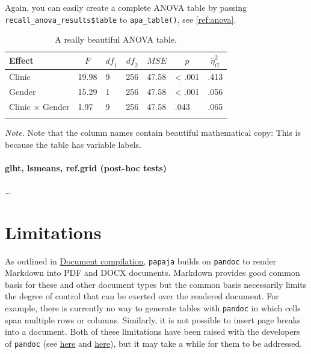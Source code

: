 \documentclass[man,floatsintext]{apa6}
\let\oldparagraph\paragraph
\renewcommand{\paragraph}[1]{\oldparagraph{#1}\mbox{}}
\theoremstyle{definition}
\theoremstyle{definition}
\theoremstyle{definition}
\theoremstyle{remark}
\begin{document}
Again, you can easily create a complete ANOVA table by passing
\texttt{recall\_anova\_results\$table} to \texttt{apa\_table()}, see
\autoref{ref:anova}.

\begin{table}[tbp]
\begin{center}
\begin{threeparttable}
\caption{\label{tab:anova-table}A really beautiful ANOVA table.}
\begin{tabular}{lllllll}
\toprule
Effect & \multicolumn{1}{c}{$F$} & \multicolumn{1}{c}{$\mathit{df}_1$} & \multicolumn{1}{c}{$\mathit{df}_2$} & \multicolumn{1}{c}{$\mathit{MSE}$} & \multicolumn{1}{c}{$p$} & \multicolumn{1}{c}{$\hat{\eta}^2_G$}\\
\midrule
Clinic & 19.98 & 9 & 256 & 47.58 & < .001 & .413\\
Gender & 15.29 & 1 & 256 & 47.58 & < .001 & .056\\
Clinic $\times$ Gender & 1.97 & 9 & 256 & 47.58 & .043 & .065\\
\bottomrule
\addlinespace
\end{tabular}
\begin{tablenotes}[para]
\normalsize{\textit{Note.} Note that the column names contain beautiful mathematical copy: This is because the table has variable labels.}
\end{tablenotes}
\end{threeparttable}
\end{center}
\end{table}

\paragraph{glht, lsmeans, ref.grid (post-hoc
tests)}\label{glht-lsmeans-ref.grid-post-hoc-tests}

\ldots{}

\section{Limitations}\label{limitations}

As outlined in \protect\hyperlink{document-compilation}{Document
compilation}, \texttt{papaja} builds on \texttt{pandoc} to render
Markdown into PDF and DOCX documents. Markdown provides good common
basis for these and other document types but the common basis
necessarily limits the degree of control that can be exerted over the
rendered document. For example, there is currently no way to generate
tables with \texttt{pandoc} in which cells span multiple rows or
columns. Similarly, it is not possible to insert page breaks into a
document. Both of these limitations have been raised with the developers
of \texttt{pandoc} (see
\href{https://github.com/jgm/pandoc/issues/1024}{here} and
\href{https://github.com/jgm/pandoc/issues/1934}{here}), but it may take
a while for them to be addressed.
\end{document}
